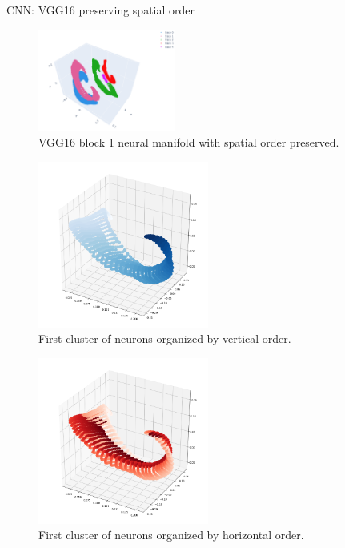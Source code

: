 \documentclass[xcolor={dvipsnames,svgnames}]{beamer}
\begin{document}
\begin{frame}{CNN: VGG16 preserving spatial order}
\begin{figure}
            \includegraphics[width=0.4\textwidth]{presentation/embeddings/VGG16-3D-block1.png}
            \caption{VGG16 block 1 neural manifold with spatial order preserved.}
        \end{figure} 
    \begin{minipage}[t]{.45\linewidth}  
    \begin{figure}
            \includegraphics[width=0.5\textwidth]{presentation/embeddings/vgg16-spatial1.png}
            \caption{First cluster of neurons organized by vertical order.}
        \end{figure} 
    \end{minipage}
      \begin{minipage}[t]{.45\linewidth}   
      \begin{figure}         \includegraphics[width=0.5\textwidth]{presentation/embeddings/vgg16-spatial2.png}
      \caption{First cluster of neurons organized by horizontal order.}
            \end{figure} 
    \end{minipage}
\end{frame}
\end{document}
